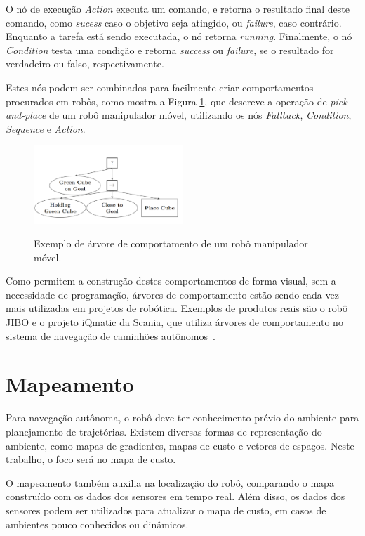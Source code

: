 \documentclass[repeatfields,xlists,xpacks,oneside,yearsonly]{ufrgscca}
\begin{document}
O nó de execução \textit{Action} executa um comando, e retorna o resultado final deste comando,
como \textit{sucess} caso o objetivo seja atingido, ou \textit{failure}, caso contrário.
Enquanto a tarefa está sendo executada, o nó retorna \textit{running}.
Finalmente, o nó \textit{Condition} testa uma condição e retorna
\textit{success} ou \textit{failure}, se o resultado
for verdadeiro ou falso, respectivamente.

Estes nós podem ser combinados para facilmente criar comportamentos
procurados em robôs, como mostra a Figura \ref{fig:bt_exemplo},
que descreve a operação de \textit{pick-and-place} de um robô manipulador móvel,
utilizando os nós \textit{Fallback}, \textit{Condition},
\textit{Sequence} e \textit{Action}.

\begin{figure}[htbp]
    {
        \centering
        \caption{Exemplo de árvore de comportamento de um robô manipulador móvel.}
        \label{fig:bt_exemplo}
        \includegraphics[width=0.5\textwidth]{bt_exemplo.png}\\
    }
    {}
\end{figure}

Como permitem a construção destes comportamentos de forma visual, sem a
necessidade de programação, árvores de comportamento estão sendo cada
vez mais utilizadas em projetos de robótica. Exemplos de produtos
reais são o robô JIBO e o projeto iQmatic da Scania, que
utiliza árvores de comportamento no sistema de navegação de caminhões
autônomos~\cite{BehaviorTree}.

\section{Mapeamento}

Para navegação autônoma, o robô deve ter conhecimento prévio do ambiente
para planejamento de trajetórias.
Existem diversas formas de representação do ambiente,
como mapas de gradientes, mapas de custo e vetores de espaços.
Neste trabalho, o foco será no mapa de custo.

O mapeamento também auxilia na localização do robô, comparando o mapa construído
com os dados dos sensores em tempo real. Além disso, os dados dos sensores podem ser
utilizados para atualizar o mapa de custo, em casos de ambientes pouco conhecidos ou dinâmicos.
\end{document}
